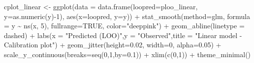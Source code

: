 \documentclass[
  letterpaper,
  DIV=11,
  numbers=noendperiod]{scrartcl}
\newenvironment{Shaded}{\begin{snugshade}}{\end{snugshade}}
\newcommand{\AttributeTok}[1]{\textcolor[rgb]{0.40,0.45,0.13}{#1}}
\newcommand{\ConstantTok}[1]{\textcolor[rgb]{0.56,0.35,0.01}{#1}}
\newcommand{\DecValTok}[1]{\textcolor[rgb]{0.68,0.00,0.00}{#1}}
\newcommand{\FloatTok}[1]{\textcolor[rgb]{0.68,0.00,0.00}{#1}}
\newcommand{\FunctionTok}[1]{\textcolor[rgb]{0.28,0.35,0.67}{#1}}
\newcommand{\NormalTok}[1]{\textcolor[rgb]{0.00,0.23,0.31}{#1}}
\newcommand{\OtherTok}[1]{\textcolor[rgb]{0.00,0.23,0.31}{#1}}
\newcommand{\SpecialCharTok}[1]{\textcolor[rgb]{0.37,0.37,0.37}{#1}}
\newcommand{\StringTok}[1]{\textcolor[rgb]{0.13,0.47,0.30}{#1}}
\begin{document}
\begin{Shaded}
\begin{Highlighting}[]
\NormalTok{cplot\_linear }\OtherTok{\textless{}{-}} \FunctionTok{ggplot}\NormalTok{(}\AttributeTok{data =} \FunctionTok{data.frame}\NormalTok{(}\AttributeTok{loopred=}\NormalTok{ploo\_linear,}
  \AttributeTok{y=}\FunctionTok{as.numeric}\NormalTok{(y)}\SpecialCharTok{{-}}\DecValTok{1}\NormalTok{), }\FunctionTok{aes}\NormalTok{(}\AttributeTok{x=}\NormalTok{loopred, }\AttributeTok{y=}\NormalTok{y)) }\SpecialCharTok{+}
  \FunctionTok{stat\_smooth}\NormalTok{(}\AttributeTok{method=}\StringTok{\textquotesingle{}glm\textquotesingle{}}\NormalTok{, }\AttributeTok{formula =}\NormalTok{ y }\SpecialCharTok{\textasciitilde{}} \FunctionTok{ns}\NormalTok{(x, }\DecValTok{5}\NormalTok{), }\AttributeTok{fullrange=}\ConstantTok{TRUE}\NormalTok{, }\AttributeTok{color=}\StringTok{"deeppink"}\NormalTok{) }\SpecialCharTok{+}
  \FunctionTok{geom\_abline}\NormalTok{(}\AttributeTok{linetype =} \StringTok{\textquotesingle{}dashed\textquotesingle{}}\NormalTok{) }\SpecialCharTok{+}
  \FunctionTok{labs}\NormalTok{(}\AttributeTok{x =} \StringTok{"Predicted (LOO)"}\NormalTok{,}\AttributeTok{y =} \StringTok{"Observed"}\NormalTok{,}\AttributeTok{title =} \StringTok{"Linear model {-} Calibration plot"}\NormalTok{) }\SpecialCharTok{+}
  \FunctionTok{geom\_jitter}\NormalTok{(}\AttributeTok{height=}\FloatTok{0.02}\NormalTok{, }\AttributeTok{width=}\DecValTok{0}\NormalTok{, }\AttributeTok{alpha=}\FloatTok{0.05}\NormalTok{) }\SpecialCharTok{+}
  \FunctionTok{scale\_y\_continuous}\NormalTok{(}\AttributeTok{breaks=}\FunctionTok{seq}\NormalTok{(}\DecValTok{0}\NormalTok{,}\DecValTok{1}\NormalTok{,}\AttributeTok{by=}\FloatTok{0.1}\NormalTok{)) }\SpecialCharTok{+}
  \FunctionTok{xlim}\NormalTok{(}\FunctionTok{c}\NormalTok{(}\DecValTok{0}\NormalTok{,}\DecValTok{1}\NormalTok{)) }\SpecialCharTok{+}
  \FunctionTok{theme\_minimal}\NormalTok{()}


\end{Highlighting}
\end{Shaded}
\end{document}
